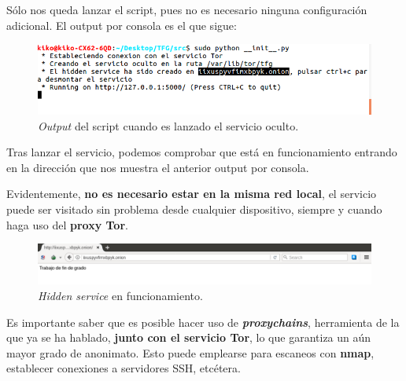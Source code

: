 Sólo nos queda lanzar el script, pues no es necesario ninguna configuración adicional. El output por consola es el que sigue:

\begin{figure}[h]
	\centerline{
		\mbox{\includegraphics[width=5.00in]{images/hs_running.png}}
	}
	\caption{\textit{Output} del script cuando es lanzado el servicio oculto.}
	\label{fig:StemOut}
\end{figure}

Tras lanzar el servicio, podemos comprobar que está en funcionamiento entrando en la dirección que nos muestra el anterior output por consola. 

Evidentemente, \textbf{no es necesario estar en la misma red local}, el servicio puede ser visitado sin problema desde cualquier dispositivo, siempre y cuando haga uso del \textbf{proxy Tor}.

\begin{figure}[h]
	\centerline{
		\mbox{\includegraphics[width=5.00in]{images/hs_running2.png}}
	}
	\caption{\textit{Hidden service} en funcionamiento.}
	\label{fig:hiddenserviceonline}
\end{figure} 


Es importante saber que es posible hacer uso de \textbf{\textit{proxychains}}, herramienta de la que ya se ha hablado, \textbf{junto con el servicio Tor}, lo que garantiza un aún mayor grado de anonimato. Esto puede emplearse para escaneos con \textbf{nmap}, establecer conexiones a servidores SSH, etcétera.


